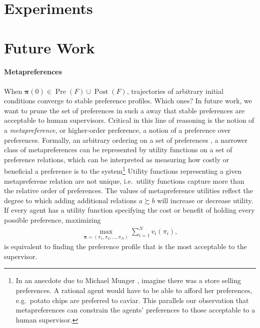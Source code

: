 \documentclass[conference]{ieeeconf}
\newcommand{\prefers}{\succsim}
\newcommand{\profile}{\boldsymbol{\pi}}
\DeclareMathOperator{\Pre}{Pre}
\DeclareMathOperator{\Post}{Post}
\begin{document}
\section{Experiments}
\label{sec:experiments}


\section{Future Work}
\label{sec:future-work}

\paragraph*{Metapreferences}

When $\profile(0)  \in \Pre(F) \cup \Post(F)$, trajectories of arbitrary initial conditions converge to stable preference profiles. Which ones? In future work, we want to prune the set of preferences in such a away that stable preferences are acceptable to human supervisors. Critical in this line of reasoning is the notion of a \emph{metapreference},  or higher-order preference, a notion of a preference over preferences. Formally, an arbitrary ordering on a set of preferences \cite{lutskanov2015}, a narrower class of metapreferences can be represented by utility functions on a set of preference relations, which can be interpreted as measuring how costly or beneficial a preference is to the system\footnote{In an anecdote due to Michael Munger \cite{munger2019}, imagine there was a store selling preferences. A rational agent would have to be able to afford her preferences, e.g.~potato chips are preferred to  caviar. This parallels our observation that metapreferences can constrain the agents' preferences to those acceptable to a human supervisor.} Utility functions representing a given metapreferene relation are not unique, i.e.~utility functions capture more than the relative order of preferences. The values of metapreference utilities reflect the degree to which adding additional relations $a \prefers b$ will increase or decrease utility. If every agent has a utility function specifying the cost or benefit of holding every possible preference, maximizing
\begin{align}
    \max_{\profile = (\pi_1,\pi_2,\dots,\pi_N)} \sum_{i=1}^N v_i(\pi_i), \label{eq:dist-opt}
\end{align}
is equivalent to finding the preference profile that is the most acceptable to the supervisor.
\end{document}
